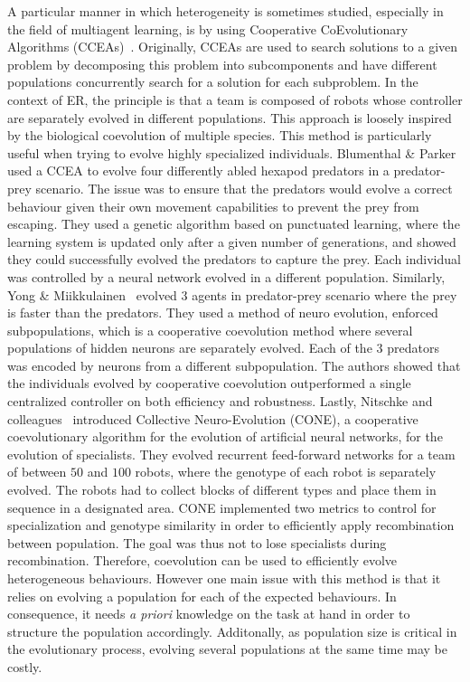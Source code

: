     A particular manner in which heterogeneity is sometimes studied, especially in the field of multiagent learning, is by using Cooperative CoEvolutionary Algorithms (CCEAs)~\parencite{Potter1994}. Originally, CCEAs are used to search solutions to a given problem by decomposing this problem into subcomponents and have different populations concurrently search for a solution for each subproblem. In the context of ER, the principle is that a team is composed of robots whose controller are separately evolved in different populations. This approach is loosely inspired by the biological coevolution of multiple species. This method is particularly useful when trying to evolve highly specialized individuals. Blumenthal \& Parker~\parencite{Blumenthal2004} used a CCEA to evolve four differently abled hexapod predators in a predator-prey scenario. The issue was to ensure that the predators would evolve a correct behaviour given their own movement capabilities to prevent the prey from escaping. They used a genetic algorithm based on punctuated learning, where the learning system is updated only after a given number of generations, and showed they could successfully evolved the predators to capture the prey. Each individual was controlled by a neural network evolved in a different population. Similarly, Yong \& Miikkulainen~\parencite{Yong2009} evolved $3$ agents in predator-prey scenario where the prey is faster than the predators. They used a method of neuro evolution, enforced subpopulations, which is a cooperative coevolution method where several populations of hidden neurons are separately evolved. Each of the $3$ predators was encoded by neurons from a different subpopulation. The authors showed that the individuals evolved by cooperative coevolution outperformed a single centralized controller on both efficiency and robustness. Lastly, Nitschke and colleagues~\parencite{Nitschke2012} introduced Collective Neuro-Evolution (CONE), a cooperative coevolutionary algorithm for the evolution of artificial neural networks, for the evolution of specialists. They evolved recurrent feed-forward networks for a team of between $50$ and $100$ robots, where the genotype of each robot is separately evolved. The robots had to collect blocks of different types and place them in sequence in a designated area. CONE implemented two metrics to control for specialization and genotype similarity in order to efficiently apply recombination between population. The goal was thus not to lose specialists during recombination. Therefore, coevolution can be used to efficiently evolve heterogeneous behaviours. However one main issue with this method is that it relies on evolving a population for each of the expected behaviours. In consequence, it needs \emph{a priori} knowledge on the task at hand in order to structure the population accordingly. Additonally, as population size is critical in the evolutionary process, evolving several populations at the same time may be costly.

